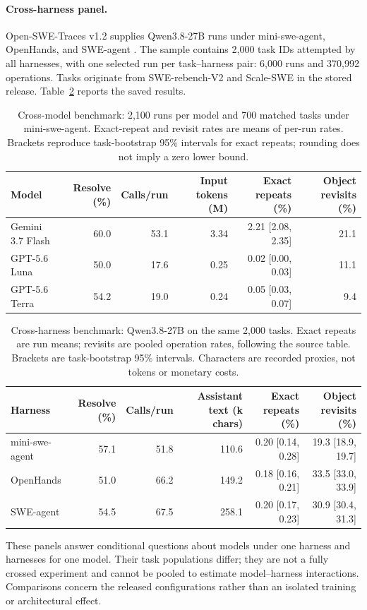 \documentclass[10pt,a4paper,twocolumn]{article}
\begin{document}
\paragraph{Cross-harness panel.}
Open-SWE-Traces v1.2 supplies Qwen3.8-27B runs under mini-swe-agent, OpenHands, and SWE-agent \citep{openswe}. The sample contains 2,000 task IDs attempted by all harnesses, with one selected run per task--harness pair: 6,000 runs and 370,992 operations. Tasks originate from SWE-rebench-V2 and Scale-SWE in the stored release. Table~\ref{tab:harness} reports the saved results.
\begin{table}[t]
\centering\small\setlength{\tabcolsep}{6pt}
\begin{tabular}{lrrrrr}
\toprule
Model & Resolve (\%) & Calls/run & Input tokens (M) & Exact repeats (\%) & Object revisits (\%)\\
\midrule
Gemini 3.7 Flash & 60.0 & 53.1 & 3.34 & 2.21 [2.08, 2.35] & 21.1\\
GPT-5.6 Luna & 50.0 & 17.6 & 0.25 & 0.02 [0.00, 0.03] & 11.1\\
GPT-5.6 Terra & 54.2 & 19.0 & 0.24 & 0.05 [0.03, 0.07] & 9.4\\
\bottomrule
\end{tabular}
\caption{Cross-model benchmark: 2,100 runs per model and 700 matched tasks under mini-swe-agent. Exact-repeat and revisit rates are means of per-run rates. Brackets reproduce task-bootstrap 95\% intervals for exact repeats; rounding does not imply a zero lower bound.}
\label{tab:model}
\end{table}
\begin{table}[t]
\centering\small\setlength{\tabcolsep}{4pt}
\begin{tabular}{lrrrrr}
\toprule
Harness & Resolve (\%) & Calls/run & Assistant text (k chars) & Exact repeats (\%) & Object revisits (\%)\\
\midrule
mini-swe-agent & 57.1 & 51.8 & 110.6 & 0.20 [0.14, 0.28] & 19.3 [18.9, 19.7]\\
OpenHands & 51.0 & 66.2 & 149.2 & 0.18 [0.16, 0.21] & 33.5 [33.0, 33.9]\\
SWE-agent & 54.5 & 67.5 & 258.1 & 0.20 [0.17, 0.23] & 30.9 [30.4, 31.3]\\
\bottomrule
\end{tabular}
\caption{Cross-harness benchmark: Qwen3.8-27B on the same 2,000 tasks. Exact repeats are run means; revisits are pooled operation rates, following the source table. Brackets are task-bootstrap 95\% intervals. Characters are recorded proxies, not tokens or monetary costs.}
\label{tab:harness}
\end{table}
These panels answer conditional questions about models under one harness and harnesses for one model. Their task populations differ; they are not a fully crossed experiment and cannot be pooled to estimate model--harness interactions. Comparisons concern the released configurations rather than an isolated training or architectural effect.
\end{document}
